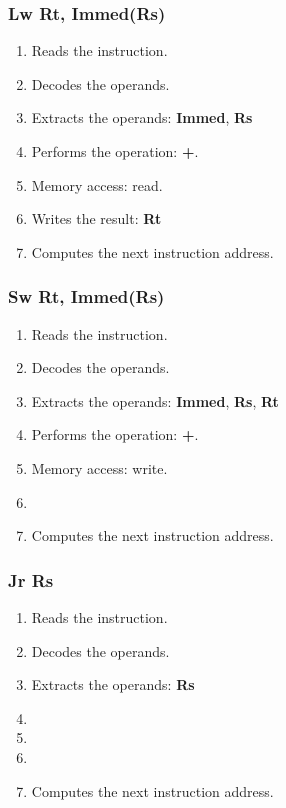 
\begin{frame}
  \frametitle{Lw Rt, Immed(Rs)}

  \begin{enumerate}
    \item
      Reads the instruction.
    \item
      Decodes the operands.
    \item
      Extracts the operands: \textbf{Immed}, \textbf{Rs}
    \item
      Performs the operation: \textbf{+}.
    \item
      Memory access: read.
    \item
      Writes the result: \textbf{Rt}
    \item
      Computes the next instruction address.
  \end{enumerate}
\end{frame}


\begin{frame}
  \frametitle{Sw Rt, Immed(Rs)}

  \begin{enumerate}
    \item
      Reads the instruction.
    \item
      Decodes the operands.
    \item
      Extracts the operands: \textbf{Immed}, \textbf{Rs}, \textbf{Rt}
    \item
      Performs the operation: \textbf{+}.
    \item
      Memory access: write.
    \item

    \item
      Computes the next instruction address.
  \end{enumerate}
\end{frame}


\begin{frame}
  \frametitle{Jr Rs}

  \begin{enumerate}
    \item
      Reads the instruction.
    \item
      Decodes the operands.
    \item
      Extracts the operands: \textbf{Rs}
    \item

    \item

    \item

    \item
      Computes the next instruction address.
  \end{enumerate}
\end{frame}

